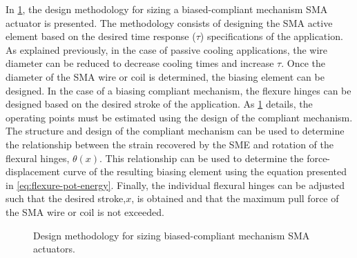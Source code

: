 In \cref{fig:flowchart-pt}, the design methodology for sizing a biased-compliant mechanism SMA actuator is presented. The methodology consists of designing the SMA active element based on the desired time response ($\tau$) specifications of the application. As explained previously, in the case of passive cooling applications, the wire diameter can be reduced to decrease cooling times and increase $\tau$. Once the diameter of the SMA wire or coil is determined, the biasing element can be designed. In the case of a biasing compliant mechanism, the flexure hinges can be designed based on the desired stroke of the application. As \cref{fig:flowchart-pt} details, the operating points must be estimated using the design of the compliant mechanism. The structure and design of the compliant mechanism can be used to determine the relationship between the strain recovered by the SME and rotation of the flexural hinges, $\theta(x)$. This relationship can be used to determine the force-displacement curve of the resulting biasing element using the equation presented in \cref{eq:flexure-pot-energy}. Finally, the individual flexural hinges can be adjusted such that the desired stroke,$x$, is obtained and that the maximum pull force of the SMA wire or coil is not exceeded.

\begin{figure}[ht]
    \centering
    \caption{Design methodology for sizing biased-compliant mechanism SMA actuators.}
    \label{fig:flowchart-pt}
\end{figure}

